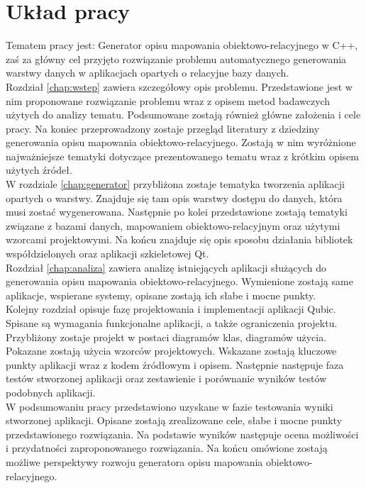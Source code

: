 \documentclass[12pt]{report}
\begin{document}
\section{Układ pracy}
Tematem pracy jest: Generator opisu mapowania obiektowo-relacyjnego w C++, zaś za główny cel przyjęto rozwiązanie problemu
automatycznego generowania warstwy danych w aplikacjach opartych o relacyjne bazy danych. \\
Rozdział \ref{chap:wstep} zawiera szczegółowy opis problemu. Przedstawione jest w nim proponowane rozwiązanie problemu 
wraz z opisem metod badawczych użytych do analizy tematu. Podsumowane zostają również główne założenia i cele pracy.
Na koniec przeprowadzony zostaje przegląd literatury z dziedziny generowania opisu mapowania obiektowo-relacyjnego. Zostają w nim wyróżnione
najważniejsze tematyki dotyczące prezentowanego tematu wraz z krótkim opisem użytych źródeł.  \\
W rozdziale \ref{chap:generator} przybliżona zostaje tematyka tworzenia aplikacji opartych o warstwy. Znajduje się tam opis warstwy dostępu do danych, która musi zostać wygenerowana. Następnie po kolei przedstawione zostają tematyki związane z bazami danych, mapowaniem obiektowo-relacyjnym oraz użytymi wzorcami projektowymi. Na końcu znajduje się opis sposobu działania bibliotek współdzielonych oraz aplikacji szkieletowej Qt. \\
Rozdział \ref{chap:analiza} zawiera analizę istniejących aplikacji służących do generowania opisu mapowania obiektowo-relacyjnego. Wymienione zostają same aplikacje, wspierane systemy, opisane zostają ich słabe i mocne punkty. \\
Kolejny rozdział opisuje fazę projektowania i implementacji aplikacji Qubic. Spisane są wymagania funkcjonalne aplikacji, a także ograniczenia projektu. Przybliżony zostaje projekt w postaci diagramów klas, diagramów użycia. Pokazane zostają użycia wzorców projektowych. Wskazane zostają kluczowe punkty aplikacji wraz z kodem źródłowym i opisem. Następnie następuje faza testów stworzonej aplikacji oraz zestawienie i porównanie wyników testów podobnych aplikacji. \\
W podsumowaniu pracy przedstawiono uzyskane w fazie testowania wyniki stworzonej aplikacji. Opisane zostają zrealizowane cele, słabe i mocne punkty przedstawionego rozwiązania. Na podstawie wyników następuje ocena możliwości i przydatności zaproponowanego rozwiązania. Na końcu omówione zostają możliwe perspektywy rozwoju generatora opisu mapowania obiektowo-relacyjnego.
\end{document}
